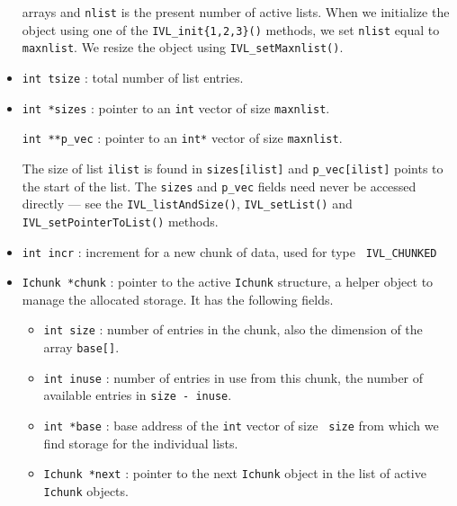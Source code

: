 \begin{itemize}
arrays and {\tt nlist} is the present number of active lists.
When we initialize the object
using one of the {\tt IVL\_init\{1,2,3\}()} methods,
we set {\tt nlist} equal to {\tt maxnlist}.
We resize the object using {\tt IVL\_setMaxnlist()}.
\item
{\tt int tsize} : total number of list entries.
\item
{\tt int *sizes} : pointer to an {\tt int} vector of size 
{\tt maxnlist}.
\par
{\tt int **p\_vec} : 
pointer to an {\tt int*} vector of size {\tt maxnlist}.
\par
The size of list {\tt ilist} is found in {\tt sizes[ilist]} 
and {\tt p\_vec[ilist]} points to the start of the list.
The {\tt sizes} and {\tt p\_vec} fields need never be accessed
directly --- see the {\tt IVL\_listAndSize()}, {\tt IVL\_setList()} 
and {\tt IVL\_setPointerToList()} methods.
\item
{\tt int incr} : increment for a new chunk of data, used for type {\tt
IVL\_CHUNKED} 
\item
{\tt Ichunk *chunk} : pointer to the active {\tt Ichunk} structure,
a helper object to manage the allocated storage. 
It has the following fields.
\begin{itemize}
\item
{\tt int size} : number of entries in the chunk, also the dimension
of the array {\tt base[]}.
\item
{\tt int inuse} : number of entries in use from this chunk, the number
of available entries in {\tt size - inuse}.
\item
{\tt int *base} : base address of the {\tt int} vector of size {\tt
size} from which we find storage for the individual lists.
\item
{\tt Ichunk *next} : pointer to the next {\tt Ichunk} object in the
list of active {\tt Ichunk} objects.
\end{itemize}
\end{itemize}

